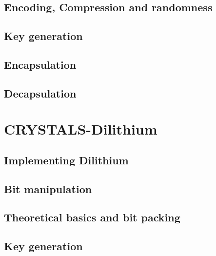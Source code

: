 \section{Encoding, Compression and randomness}
\label{sec:kyber_enc_compr}


\section{Key generation}
\label{sec:kyber_keygen}


\section{Encapsulation}
\label{sec:kyber_enc}


\section{Decapsulation}
\label{sec:kyber_dec}


\chapter{CRYSTALS-Dilithium}
\label{ch:dilithium}


\section{Implementing Dilithium}
\label{sec:implementing_dil}


\section{Bit manipulation}
\label{sec:dil_bit_man}


\section{Theoretical basics and bit packing}
\label{sec:dil_bit_pack}


\section{Key generation}
\label{sec:dil_keygen}


